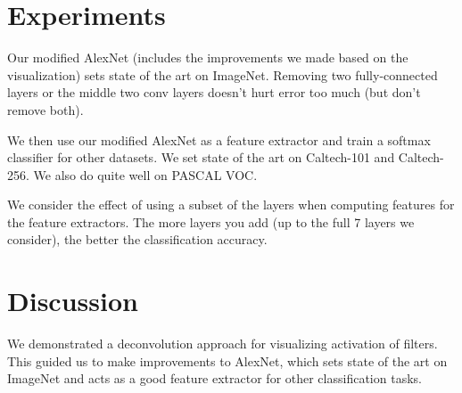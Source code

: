 \documentclass[a4paper]{article}
\begin{document}
\section{Experiments}
Our modified AlexNet (includes the improvements we made based on the
visualization) sets state of the art on ImageNet. Removing two fully-connected
layers or the middle two conv layers doesn't hurt error too much (but don't
remove both).

We then use our modified AlexNet as a feature extractor and train a softmax
classifier for other datasets. We set state of the art on Caltech-101
and Caltech-256. We also do quite well on PASCAL VOC.

We consider the effect of using a subset of the layers when computing
features for the feature extractors. The more layers you add (up to the
full 7 layers we consider), the better the classification accuracy.

\section{Discussion}
We demonstrated a deconvolution approach for visualizing activation of filters.
This guided us to make improvements to AlexNet, which sets state of the art on
ImageNet and acts as a good feature extractor for other classification tasks.
\end{document}
